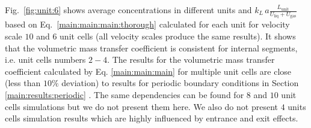 \documentclass[review,12pt]{elsarticle}
\newcommand{\beq}{\begin{equation}}
\newcommand{\feq}{\end{equation}}
\newcommand{\beqal}{\begin{equation}\begin{aligned}}
\newcommand{\feqal}{\end{aligned}\end{equation}}
\newcommand{\vol}{k_L\,a}
\newcommand{\lunit}{L_{\mathrm{unit}}}
\newcommand{\ububble}{U_{\mathrm{bubble}}}
\newcommand{\uliq}{U_{\mathrm{liq}}}
\newcommand{\ugas}{U_{\mathrm{gas}}}
\newcommand{\cstar}{C^{*}}
\newcommand{\volnondim}{\vol \frac{\lunit}{\uliq+\ugas}}
\begin{document}
Fig.~\ref{fig:unit:6} shows average concentrations in different units and $\volnondim$ based on
Eq.~\ref{main:main:main:thorough} calculated for each unit for velocity
scale $10$ and  $6$ unit cells (all velocity scales produce the same results). It shows that the
volumetric mass transfer coefficient is consistent for internal segments, i.e.
unit cells numbers $2-4$.  The results for the volumetric mass transfer
coefficient calculated by Eq. \ref{main:main:main} for multiple unit cells are
close (less than $10\%$ deviation) to results for periodic boundary conditions in Section
\ref{main:results:periodic} . 
The same dependencies
can be found for
$8$ and $10$ unit cells simulations but we do not present them here. We also do not present $4$
units cells simulation results which are highly influenced by entrance and exit effects.
\end{document}
